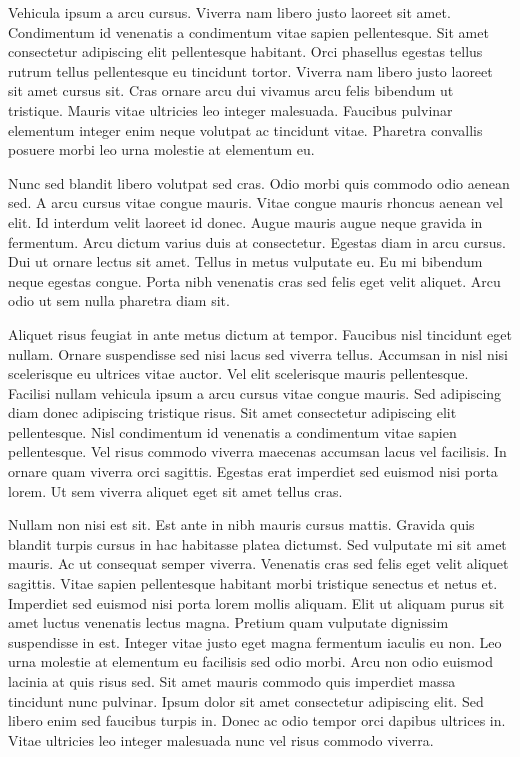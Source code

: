 \documentclass[11pt,a4paper]{article}
\begin{document}
Vehicula ipsum a arcu cursus. Viverra nam libero justo laoreet sit amet. Condimentum id venenatis a condimentum vitae sapien pellentesque. Sit amet consectetur adipiscing elit pellentesque habitant. Orci phasellus egestas tellus rutrum tellus pellentesque eu tincidunt tortor. Viverra nam libero justo laoreet sit amet cursus sit. Cras ornare arcu dui vivamus arcu felis bibendum ut tristique. Mauris vitae ultricies leo integer malesuada. Faucibus pulvinar elementum integer enim neque volutpat ac tincidunt vitae. Pharetra convallis posuere morbi leo urna molestie at elementum eu.

Nunc sed blandit libero volutpat sed cras. Odio morbi quis commodo odio aenean sed. A arcu cursus vitae congue mauris. Vitae congue mauris rhoncus aenean vel elit. Id interdum velit laoreet id donec. Augue mauris augue neque gravida in fermentum. Arcu dictum varius duis at consectetur. Egestas diam in arcu cursus. Dui ut ornare lectus sit amet. Tellus in metus vulputate eu. Eu mi bibendum neque egestas congue. Porta nibh venenatis cras sed felis eget velit aliquet. Arcu odio ut sem nulla pharetra diam sit.

Aliquet risus feugiat in ante metus dictum at tempor. Faucibus nisl tincidunt eget nullam. Ornare suspendisse sed nisi lacus sed viverra tellus. Accumsan in nisl nisi scelerisque eu ultrices vitae auctor. Vel elit scelerisque mauris pellentesque. Facilisi nullam vehicula ipsum a arcu cursus vitae congue mauris. Sed adipiscing diam donec adipiscing tristique risus. Sit amet consectetur adipiscing elit pellentesque. Nisl condimentum id venenatis a condimentum vitae sapien pellentesque. Vel risus commodo viverra maecenas accumsan lacus vel facilisis. In ornare quam viverra orci sagittis. Egestas erat imperdiet sed euismod nisi porta lorem. Ut sem viverra aliquet eget sit amet tellus cras.

Nullam non nisi est sit. Est ante in nibh mauris cursus mattis. Gravida quis blandit turpis cursus in hac habitasse platea dictumst. Sed vulputate mi sit amet mauris. Ac ut consequat semper viverra. Venenatis cras sed felis eget velit aliquet sagittis. Vitae sapien pellentesque habitant morbi tristique senectus et netus et. Imperdiet sed euismod nisi porta lorem mollis aliquam. Elit ut aliquam purus sit amet luctus venenatis lectus magna. Pretium quam vulputate dignissim suspendisse in est. Integer vitae justo eget magna fermentum iaculis eu non. Leo urna molestie at elementum eu facilisis sed odio morbi. Arcu non odio euismod lacinia at quis risus sed. Sit amet mauris commodo quis imperdiet massa tincidunt nunc pulvinar. Ipsum dolor sit amet consectetur adipiscing elit. Sed libero enim sed faucibus turpis in. Donec ac odio tempor orci dapibus ultrices in. Vitae ultricies leo integer malesuada nunc vel risus commodo viverra.
\end{document}
